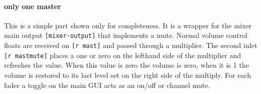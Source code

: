 \paragraph{only one master}
This is a simple part shown only for completeness. It is a wrapper for 
the mixer main output \verb+[mixer-output]+ that implements a mute. Normal volume
control floats are received on \verb+[r mast]+ and passed through a multiplier.
The second inlet \verb+[r mastmute]+ places a one or zero on the lefthand side
of the multiplier and refreshes the value. When this value is zero the volume
is zero, when it is 1 the volume is restored to its last level set on the
right side of the multiply. For each fader a toggle on the main GUI 
acts as an on/off or channel mute. 